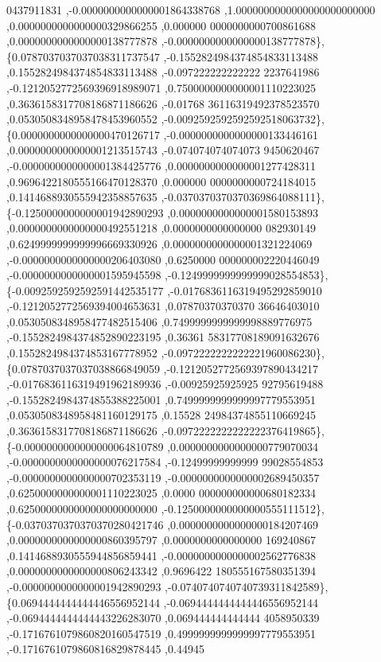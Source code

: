 \begin{DoxyCode}
      0437911831 ,-0.0000000000000001864338768 ,1.0000000000000000000000000 ,0.0000000000000000329866255 ,0.000000
      0000000000700861688 ,0.0000000000000000138777878 ,-0.0000000000000000138777878\},
\{0.0787037037037038311737547 ,-0.1552824984374854833113488 ,0.1552824984374854833113488 ,-0.097222222222222
      2237641986 ,-0.1212052772569396918989071 ,0.7500000000000001110223025 ,0.3636158317708186871186626 ,-0.01768
      36116319492378523570 ,0.0530508348958478453960552 ,-0.0092592592592592518063732\},
\{0.0000000000000000470126717 ,-0.0000000000000000133446161 ,0.0000000000000001213515743 ,-0.074074074074073
      9450620467 ,-0.0000000000000001384425776 ,0.0000000000000001277428311 ,0.9696422180555166470128370 ,0.000000
      0000000000724184015 ,0.1414688930555942358857635 ,-0.0370370370370369864088111\},
\{-0.1250000000000001942890293 ,0.0000000000000001580153893 ,0.0000000000000000492551218 ,0.0000000000000000
      082930149 ,0.6249999999999996669330926 ,0.0000000000000001321224069 ,-0.0000000000000000206403080 ,0.6250000
      000000002220446049 ,-0.0000000000000001595945598 ,-0.1249999999999999028554853\},
\{-0.0092592592592591442535177 ,-0.0176836116319495292859010 ,-0.1212052772569394004653631 ,0.07870370370370
      36646403010 ,0.0530508348958477482515406 ,0.7499999999999998889776975 ,-0.1552824984374852890223195 ,0.36361
      58317708189091632676 ,0.1552824984374853167778952 ,-0.0972222222222221960086230\},
\{0.0787037037037038866849059 ,-0.1212052772569397890434217 ,-0.0176836116319491962189936 ,-0.00925925925925
      92795619488 ,-0.1552824984374855388225001 ,0.7499999999999997779553951 ,0.0530508348958481160129175 ,0.15528
      24984374855110669245 ,0.3636158317708186871186626 ,-0.0972222222222222376419865\},
\{-0.0000000000000000064810789 ,0.0000000000000000779070034 ,-0.0000000000000000076217584 ,-0.12499999999999
      99028554853 ,-0.0000000000000000702353119 ,-0.0000000000000002689450357 ,0.6250000000000001110223025 ,0.0000
      000000000000680182334 ,0.6250000000000000000000000 ,-0.1250000000000000555111512\},
\{-0.0370370370370370280421746 ,0.0000000000000000184207469 ,0.0000000000000000860395797 ,0.0000000000000000
      169240867 ,0.1414688930555944856859441 ,-0.0000000000000002562776838 ,0.0000000000000000806243342 ,0.9696422
      180555167580351394 ,-0.0000000000000001942890293 ,-0.0740740740740739311842589\},
\{0.0694444444444446556952144 ,-0.0694444444444446556952144 ,-0.0694444444444443226283070 ,0.069444444444444
      4058950339 ,-0.1716761079860820160547519 ,0.4999999999999997779553951 ,-0.1716761079860816829878445 ,0.44945

\end{DoxyCode}
